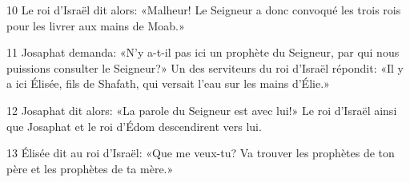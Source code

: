 
10 Le roi d’Israël dit alors: «Malheur! Le Seigneur a donc convoqué les trois rois pour les livrer aux mains de Moab.»

11 Josaphat demanda: «N’y a-t-il pas ici un prophète du Seigneur, par qui nous puissions consulter le Seigneur?» Un des serviteurs du roi d’Israël répondit: «Il y a ici Élisée, fils de Shafath, qui versait l’eau sur les mains d’Élie.»

12 Josaphat dit alors: «La parole du Seigneur est avec lui!» Le roi d’Israël ainsi que Josaphat et le roi d’Édom descendirent vers lui.

13 Élisée dit au roi d’Israël: «Que me veux-tu? Va trouver les prophètes de ton père et les prophètes de ta mère.»